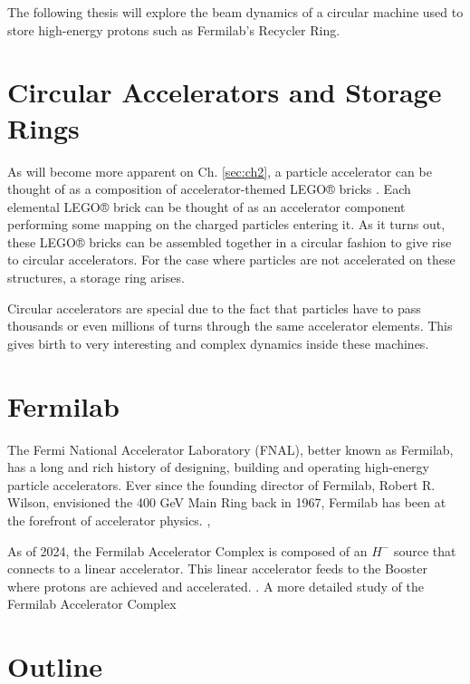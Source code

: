 The following thesis will explore the beam dynamics of a circular machine used to store high-energy protons such as Fermilab's Recycler Ring.         

\section{Circular Accelerators and Storage Rings}

As will become more apparent on Ch. \ref{sec:ch2}, a particle accelerator can be thought of as a composition of accelerator-themed LEGO® bricks \cite{forest}. Each elemental LEGO® brick can be thought of as an accelerator component performing some mapping on the charged particles entering it. As it turns out, these LEGO® bricks can be assembled together in a circular fashion to give rise to circular accelerators. For the case where particles are not accelerated on these structures, a storage ring arises.     

Circular accelerators are special due to the fact that particles have to pass thousands or even millions of turns through the same accelerator elements. This gives birth to very interesting and complex dynamics inside these machines.   

\section{Fermilab}

The Fermi National Accelerator Laboratory (FNAL), better known as Fermilab, has a long and rich history of designing, building and operating high-energy particle accelerators. Ever since the founding director of Fermilab, Robert R. Wilson, envisioned the 400 GeV Main Ring back in 1967, Fermilab has been at the forefront of accelerator physics.     \cite{tevatron},\cite{fermilab1}

As of 2024, the Fermilab Accelerator Complex is composed of an $H^-$ source that connects to a linear accelerator. This linear accelerator feeds to the Booster where protons are achieved and accelerated. . A more detailed study of the Fermilab Accelerator Complex  

\section{Outline}


